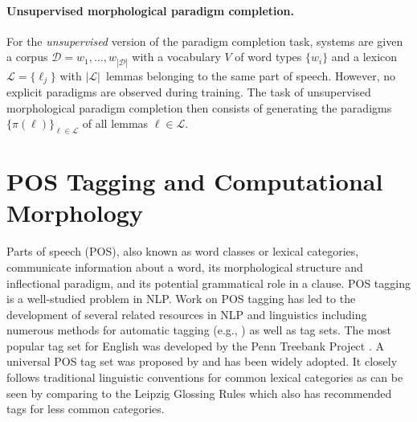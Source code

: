 \paragraph{Unsupervised morphological paradigm completion. } For the \textit{unsupervised} version of the paradigm completion task, systems are given a corpus $\mathcal{D}=w_1,\dots,w_{|\mathcal{D}|}$ with a vocabulary $V$ of word types $\{w_i\}$ and a lexicon $\mathcal{L} = \{\ell_j\}$ with $|\mathcal{L}|$~lemmas belonging to the same part of speech. However, no explicit paradigms are observed during training.
The task of unsupervised morphological paradigm completion then consists of
generating the paradigms~$\{\pi(\ell)\}_{\ell\in\mathcal{L}}$ of all lemmas $\ell \in \mathcal{L}$.




\section{POS Tagging and Computational Morphology}
\label{sec:POSlitreview}

Parts of speech (POS), also known as word classes or lexical categories, communicate information about a word, its morphological structure and inflectional paradigm, and its potential grammatical role in a clause. POS tagging is a well-studied problem in NLP. Work on POS tagging has led to the development of several related resources in NLP and linguistics including numerous methods for automatic tagging (e.g., \citet{kupiec_robust_1992,toutanova_bayesian_2008}) as well as tag sets. The most popular tag set for English was developed by the Penn Treebank Project \citep{penn_mitchell_1993}. A universal POS tag set was proposed by \citet{petrov_universal_2012} and has been widely adopted. It closely follows traditional linguistic conventions for common lexical categories as can be seen by comparing to the Leipzig Glossing Rules \citep{leipzig_2008} which also has recommended tags for less common categories.

